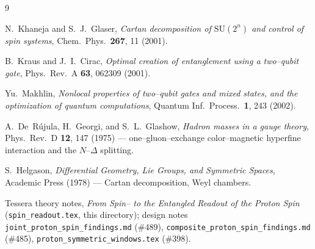 \documentclass[11pt,oneside]{article}
\newcommand{\code}[1]{\texttt{#1}}
\theoremstyle{plain}
\begin{document}
\begin{thebibliography}{9}

 N.~Khaneja and S.~J.~Glaser,
  \emph{Cartan decomposition of $\mathrm{SU}(2^n)$ and control of spin systems},
  Chem.\ Phys.\ \textbf{267}, 11 (2001).

 B.~Kraus and J.~I.~Cirac,
  \emph{Optimal creation of entanglement using a two--qubit gate},
  Phys.\ Rev.\ A \textbf{63}, 062309 (2001).

 Yu.~Makhlin,
  \emph{Nonlocal properties of two--qubit gates and mixed states, and the
  optimization of quantum computations},
  Quantum Inf.\ Process.\ \textbf{1}, 243 (2002).

 A.~De~R\'ujula, H.~Georgi, and S.~L.~Glashow,
  \emph{Hadron masses in a gauge theory},
  Phys.\ Rev.\ D \textbf{12}, 147 (1975) --- one--gluon--exchange color--magnetic
  hyperfine interaction and the $N$--$\Delta$ splitting.

 S.~Helgason,
  \emph{Differential Geometry, Lie Groups, and Symmetric Spaces},
  Academic Press (1978) --- Cartan decomposition, Weyl chambers.

 Tessera theory notes,
  \emph{From Spin--\textonehalf{} to the Entangled Readout of the Proton Spin}
  (\code{spin\_readout.tex}, this directory); design notes
  \code{joint\_proton\_spin\_findings.md} (\#489),
  \code{composite\_proton\_spin\_findings.md} (\#485),
  \code{proton\_symmetric\_windows.tex} (\#398).

\end{thebibliography}
\end{document}
